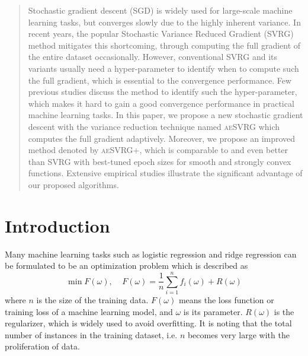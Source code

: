 \documentclass[conference]{IEEEtran}
\begin{document}

\maketitle

\begin{abstract}
    Stochastic gradient descent (SGD) is widely used for large-scale machine learning tasks, but converges slowly due to the highly inherent variance. In recent years, the popular Stochastic Variance Reduced Gradient (SVRG) method mitigates this shortcoming, through computing the full gradient of the entire dataset occasionally. However, conventional SVRG and its variants usually need a hyper-parameter to identify when to compute such the full gradient, which is essential to the convergence performance. Few previous studies discuss the method to identify such the hyper-parameter, which makes it hard to gain a good convergence performance in practical machine learning tasks.  In this paper, we propose a new stochastic gradient descent with the variance reduction technique named \textsc{aeSVRG} which computes the full gradient adaptively.  Moreover, we propose an improved method denoted by \textsc{aeSVRG+}, which is comparable to and even better than SVRG with best-tuned epoch sizes for smooth and strongly convex functions. Extensive empirical studies illustrate the significant advantage of our proposed algorithms.


\end{abstract}


%
\IEEEpeerreviewmaketitle



\section{Introduction}
Many machine learning tasks such as logistic regression and ridge regression can be formulated to be an optimization problem which is described as 
\begin{equation}
\label{equation_loss_minimization}
\min F(\omega),~~~~~F(\omega)=\frac{1}{n}\sum\limits_{i=1}^n f_i(\omega)+R(\omega)
\end{equation}
where $n$ is the size of the training data. $F(\omega)$ means the loss function or training loss of a machine learning model, and $\omega$ is its parameter. $R(\omega)$ is the regularizer, which is widely used to avoid overfitting. It is noting that the total number of instances in the training dataset, i.e. $n$ becomes very large with the proliferation of data. 
\end{document}

